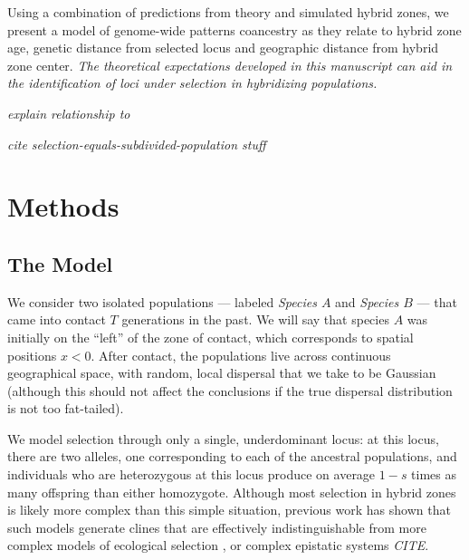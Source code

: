 \documentclass[11pt,letterpaper]{article}
\newcommand{\plr}[1]{{\em \color{blue} #1}}
\newcommand{\yb}[1]{{\em \color{magenta} #1}}
\begin{document}
Using a combination of predictions from theory and simulated hybrid zones, we present a model of genome-wide patterns coancestry as they relate to hybrid zone age, genetic distance from selected locus and geographic distance from hybrid zone center.  
\yb{The theoretical expectations developed in this manuscript can aid in the identification of loci under selection in hybridizing populations.} 


\plr{explain relationship to \citet{Sedghifar2015}}


\plr{cite selection-equals-subdivided-population stuff}

\section*{Methods}

\subsection*{The Model}

We consider two isolated populations
--- labeled \emph{Species $A$} and \emph{Species $B$} ---  
that came into contact $T$ generations in the past.  
We will say that species $A$ was initially on the ``left'' of the zone of contact, which corresponds to spatial positions $x<0$.  
After contact, the populations live across continuous geographical space,
with random, local dispersal that we take to be Gaussian
(although this should not affect the conclusions if the true dispersal distribution is not too fat-tailed).

We model selection through only a single, underdominant locus:
at this locus, there are two alleles, one corresponding to each of the ancestral populations,
and individuals who are heterozygous at this locus produce on average $1-s$ times as many offspring than either homozygote.
Although most selection in hybrid zones is likely more complex than this simple situation, 
previous work has shown that such models generate clines that are effectively indistinguishable from more complex models of ecological selection \citep{Barton1989, Barton1993},
or complex epistatic systems \plr{CITE}.
\end{document}
